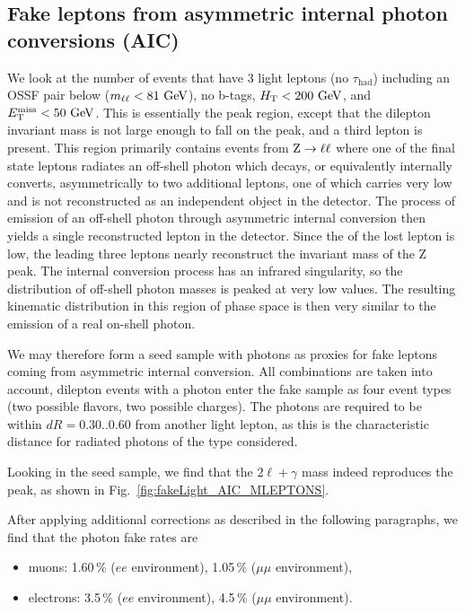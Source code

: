 \subsection{Fake leptons from asymmetric internal photon conversions (AIC)}
\label{sec:bkg_fakeLight/photons}
We look at the number of events that have 3 light leptons (no $\tau_\textrm{had}$) including an OSSF pair below \Z (\ie $m_{\ell\ell} < 81\,\,\text{Ge\hspace{-.08em}V}$), no b-tags, $H_{\mathrm{T}} < 200\,\,\text{Ge\hspace{-.08em}V}$, and $E_{\mathrm{T}}^{\text{miss}} < 50\,\,\text{Ge\hspace{-.08em}V}$. This is essentially the \Z peak region, except that the dilepton invariant mass is not large enough to fall on the \Z peak, and a third lepton is present. This region primarily contains events from $\mathrm{Z} \to \ell\ell$ where one of the final state leptons radiates an off-shell photon which decays, or equivalently internally converts, asymmetrically to two additional leptons, one of which carries very low \pt and is not reconstructed as an independent object in the detector. The process of emission of an off-shell photon through asymmetric internal conversion then yields a single reconstructed lepton in the detector. Since the \pt of the lost lepton is low, the leading three leptons nearly reconstruct the invariant mass of the Z peak. The internal conversion process has an infrared singularity, so the distribution of off-shell photon masses is peaked at very low values. The resulting kinematic distribution in this region of phase space is then very similar to the emission of a real on-shell photon. 

We may therefore form a seed sample with photons as proxies for fake leptons coming from asymmetric internal conversion. All combinations are taken into account, \ie dilepton events with a photon enter the fake sample as four event types (two possible flavors, two possible charges). The photons are required to be within $dR = 0.30..0.60$ from another light lepton, as this is the characteristic distance for radiated photons of the type considered. 

Looking in the seed sample, we find that the $2\ell+\gamma$ mass indeed reproduces the \Z peak, as shown in Fig.~\ref{fig:fakeLight_AIC_MLEPTONS}. %

After applying additional corrections as described in the following paragraphs, we find that the photon fake rates are
\begin{itemize}
	\item muons: 1.60\,\% ($ee$ environment), 1.05\,\% ($\mu\mu$ environment),
	\item electrons: 3.5\,\% ($ee$ environment), 4.5\,\% ($\mu\mu$ environment).
\end{itemize}

